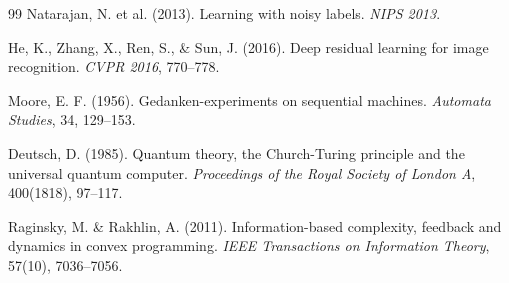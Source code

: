 \begin{thebibliography}{99}
Natarajan, N. et al. (2013).
Learning with noisy labels.
\emph{NIPS 2013}.

He, K., Zhang, X., Ren, S., \& Sun, J. (2016).
Deep residual learning for image recognition.
\emph{CVPR 2016}, 770--778.

Moore, E. F. (1956).
Gedanken-experiments on sequential machines.
\emph{Automata Studies}, 34, 129--153.

Deutsch, D. (1985).
Quantum theory, the Church-Turing principle and the universal quantum computer.
\emph{Proceedings of the Royal Society of London A}, 400(1818), 97--117.

Raginsky, M. \& Rakhlin, A. (2011).
Information-based complexity, feedback and dynamics in convex programming.
\emph{IEEE Transactions on Information Theory}, 57(10), 7036--7056.

\end{thebibliography}



